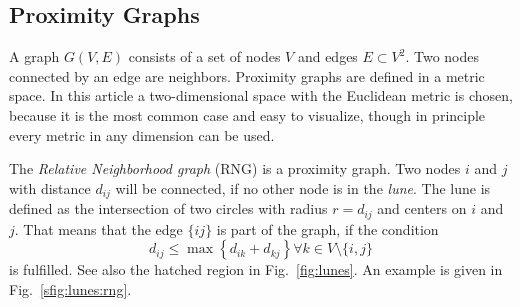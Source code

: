 \label{sec:model}
\subsection{Proximity Graphs}
\label{ssec:graphtypes}
    A graph \(G(V,E)\) consists of a set of nodes \(V\) and edges \(E \subset V^{2}\).
    Two nodes connected by an edge are neighbors.
    Proximity graphs are defined in a metric space. In this article a
    two-dimensional space with the Euclidean metric is chosen, because
    it is the most common case and easy to visualize, though in principle
    every metric in any dimension can be used.

    The \emph{Relative Neighborhood graph} (RNG) \cite{Toussaint1980} is
    a proximity graph. Two nodes \(i\) and \(j\) with distance $d_{ij}$
    will be connected, if no other node is in the \emph {lune}. The lune
    is defined as the intersection of two circles with radius \(r =
    d_{ij}\) and centers on \(i\) and \(j\). That means that the edge
    $\{ij\}$ is part of the graph, if the condition
    \[d_{ij} \le \max\left\{ d_{ik} + d_{kj} \right\} \forall k \in V\setminus\{i,j\}\]
    is fulfilled. See also the hatched region
    in Fig.~\ref{fig:lunes}. An example is given in Fig.~\ref{sfig:lunes:rng}.

